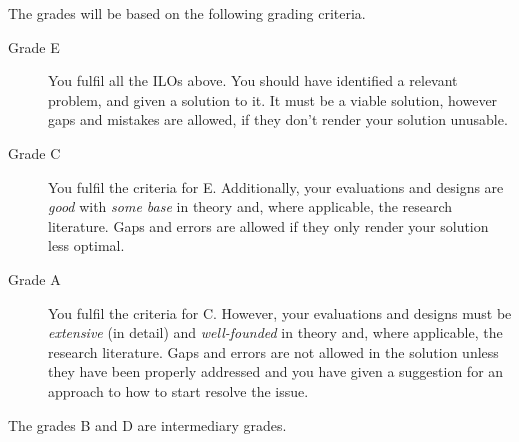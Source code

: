 \documentclass{miunasgn}
\begin{document}
The grades will be based on the following grading criteria.
\begin{description}
  \item[Grade E] You fulfil all the \acp{ILO} above.
    You should have identified a relevant problem, and given a solution to it.
    It must be a viable solution, however gaps and mistakes are allowed, if 
    they don't render your solution unusable.

  \item[Grade C] You fulfil the criteria for E.
    Additionally, your evaluations and designs are \emph{good} with \emph{some 
      base} in theory and, where applicable, the research literature.
    Gaps and errors are allowed if they only render your solution less optimal.

  \item[Grade A] You fulfil the criteria for C.
    However, your evaluations and designs must be \emph{extensive} (in detail) 
    and \emph{well-founded} in theory and, where applicable, the research 
    literature.
    Gaps and errors are not allowed in the solution unless they have been 
    properly addressed and you have given a suggestion for an approach to how 
    to start resolve the issue.
\end{description}
The grades B and D are intermediary grades.


\clearpage



\printbibliography
\end{document}
